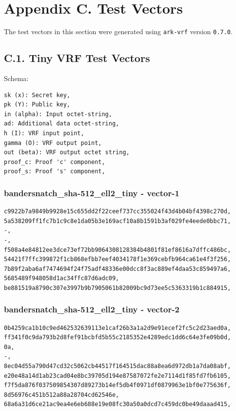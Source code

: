 \documentclass[
]{article}
\begin{document}
\section{Appendix C. Test Vectors}\label{appendix-c.-test-vectors}

The test vectors in this section were generated using \texttt{ark-vrf}
version \texttt{0.7.0}.

\subsection{C.1. Tiny VRF Test
Vectors}\label{c.1.-tiny-vrf-test-vectors}

Schema:

\begin{verbatim}
sk (x): Secret key,
pk (Y): Public key,
in (alpha): Input octet-string,
ad: Additional data octet-string,
h (I): VRF input point,
gamma (O): VRF output point,
out (beta): VRF output octet string,
proof_c: Proof 'c' component,
proof_s: Proof 's' component,
\end{verbatim}

\subsubsection{bandersnatch\_sha-512\_ell2\_tiny -
vector-1}\label{bandersnatch_sha-512_ell2_tiny---vector-1}

\begin{verbatim}
c9922b7a9849b9928e15c655dd2f22ceef737cc355024f43d4b04bf4398c270d,
5a538209ff1fc7b1c9c8e1da05b3e169acf10a8b1591b3af029fe4eede0bbc71,
-,
-,
f508a4e84812ee3dce73ef72bb9064308128384b4801f81ef8616a7dffc486bc,
54421f7ffc399872f1cb868efbb7eef4034178f1e369cebfb964ca61e4f3f256,
7b89f2aba6af7474694f24f75adf48336e00dcc8f3ac889ef4daa53c859497a6,
5685489f948058d1ac34ffc87d6adc09,
be881519a8790c307e3997b9b7905061b82009bc9d73ee5c5363319b1c884915,
\end{verbatim}

\subsubsection{bandersnatch\_sha-512\_ell2\_tiny -
vector-2}\label{bandersnatch_sha-512_ell2_tiny---vector-2}

\begin{verbatim}
0b4259ca1b10c9ed462532639113e1caf26b3a1a2d9e91ecef2fc5c2d23aed0a,
ff341f0c9da793b2d8fef91bcbfd5b55c2185352e4289edc1dd6c64e3fe09b0d,
0a,
-,
8ec04d55a790d47cd32c5062cb44517f164515dac88a8ea6d972db1a7da08abf,
e20e48a14d1ab23cad04e8bc39705d194e87587072fe2e7114d1f85fd7fb6105,
f7f5da876f037509854307d89273b14ef5db4f0971df0879963e1bf0e775636f,
8d56976c451b512a88a28704cd62546e,
68a6a31d6ce21ac9ea4e6eb688e19e08fc30a50a0dcd7c459dc0be49daaad415,
\end{verbatim}
\end{document}
